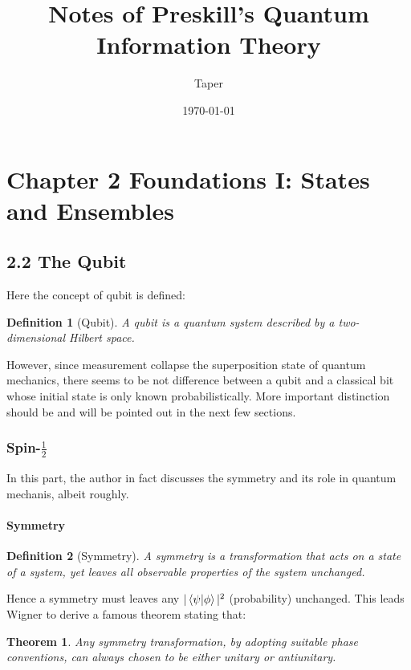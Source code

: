 \documentclass{article}
\title{Notes of Preskill's Quantum Information Theory}
\date{\today}
\author{Taper}
\numberwithin{equation}{subsection} %
\newtheorem{defi}{Definition}[section]
\newtheorem{thm}{Theorem}[section]
\theoremstyle{definition}
\begin{document}
\maketitle
{}
\tableofcontents
\section{Chapter 2 Foundations I: States and Ensembles}
\label{sec:Chapter_2_Foundations_I_States_and_Ensembles}

\subsection{2.2 The Qubit}
\label{sec:2.2_The_Qubit}
Here the concept of qubit is defined:
\begin{defi}[Qubit]
    A qubit is a quantum system described by a two-dimensional 
    Hilbert space.
\end{defi}
However, since measurement collapse the superposition state of quantum
mechanics, there seems to be not difference between a qubit and a 
classical bit whose initial state is only known probabilistically.
More important distinction should be and will be pointed out in the
next few sections.

    \subsubsection{Spin-\texorpdfstring{$\frac{1}{2}$}{}} 
    In this part, the author in fact discusses the symmetry and its role
    in quantum mechanis, albeit roughly.

    \paragraph{Symmetry}
    \begin{defi}[Symmetry]
    A symmetry is a \textit{transformation} that acts on a state of a
    system, yet leaves all observable properties of the system unchanged.
    \end{defi}
    Hence a symmetry must leaves any $|\braket{\psi|\phi}|^2$ 
    (probability) unchanged. This leads Wigner to derive a famous theorem
    stating that:
    \begin{thm}
        Any symmetry transformation, by adopting suitable phase conventions,
        can always chosen to be either unitary or antiunitary.
    \end{thm}
\end{document}
